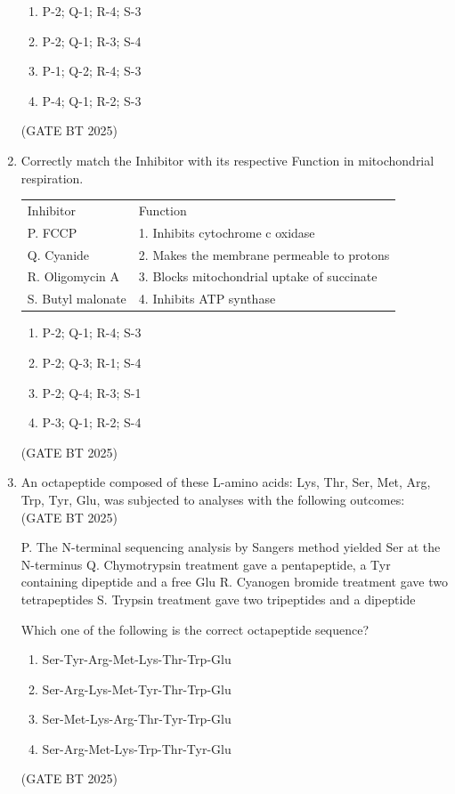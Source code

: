 \documentclass[journal,12pt,onecolumn]{IEEEtran}
\theoremstyle{remark}
\begin{document}
\begin{enumerate}
\begin{enumerate}
    \item P-2; Q-1; R-4; S-3
    \item P-2; Q-1; R-3; S-4
    \item P-1; Q-2; R-4; S-3
    \item P-4; Q-1; R-2; S-3
\end{enumerate}  
\hfill (GATE BT 2025)

\item Correctly match the Inhibitor with its respective Function in mitochondrial respiration.  

\begin{tabular}{ll}
Inhibitor & Function \\
P. FCCP & 1. Inhibits cytochrome c oxidase \\
Q. Cyanide & 2. Makes the membrane permeable to protons \\
R. Oligomycin A & 3. Blocks mitochondrial uptake of succinate \\
S. Butyl malonate & 4. Inhibits ATP synthase
\end{tabular}  

\begin{enumerate}
    \item P-2; Q-1; R-4; S-3
    \item P-2; Q-3; R-1; S-4
    \item P-2; Q-4; R-3; S-1
    \item P-3; Q-1; R-2; S-4
\end{enumerate}  
\hfill (GATE BT 2025)


\item An octapeptide composed of these L-amino acids: Lys, Thr, Ser, Met, Arg, Trp, Tyr, Glu, was subjected to analyses with the following outcomes:  
\hfill (GATE BT 2025)


P. The N-terminal sequencing analysis by Sangers method yielded Ser at the N-terminus  
Q. Chymotrypsin treatment gave a pentapeptide, a 
Tyr containing dipeptide and a free Glu  
R. Cyanogen bromide treatment gave two tetrapeptides  
S. Trypsin treatment gave two tripeptides and a dipeptide  

Which one of the following is the correct octapeptide sequence?  

\begin{enumerate}
    \item Ser-Tyr-Arg-Met-Lys-Thr-Trp-Glu
    \item Ser-Arg-Lys-Met-Tyr-Thr-Trp-Glu
    \item Ser-Met-Lys-Arg-Thr-Tyr-Trp-Glu
    \item Ser-Arg-Met-Lys-Trp-Thr-Tyr-Glu
\end{enumerate}  
\hfill (GATE BT 2025)


\end{enumerate}
\end{document}
